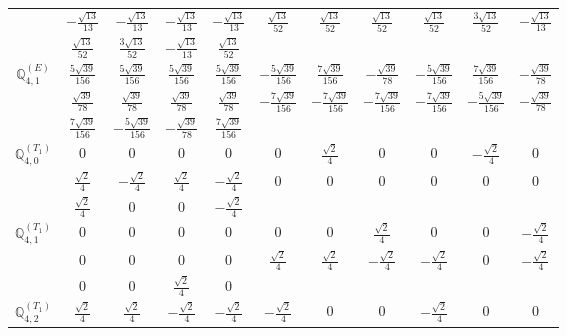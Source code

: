 \documentclass[fleqn,10pt,landscape]{article}
\begin{document}
\begin{itemize}
{\begin{center}
\begin{longtable}{ccccccccccc}
& $ - \frac{\sqrt{13}}{13} $ & $ - \frac{\sqrt{13}}{13} $ & $ - \frac{\sqrt{13}}{13} $ & $ - \frac{\sqrt{13}}{13} $ & $ \frac{\sqrt{13}}{52} $ & $ \frac{\sqrt{13}}{52} $ & $ \frac{\sqrt{13}}{52} $ & $ \frac{\sqrt{13}}{52} $ & $ \frac{3 \sqrt{13}}{52} $ & $ - \frac{\sqrt{13}}{13} $ \\
& $ \frac{\sqrt{13}}{52} $ & $ \frac{3 \sqrt{13}}{52} $ & $ - \frac{\sqrt{13}}{13} $ & $ \frac{\sqrt{13}}{52} $ & $  $ & $  $ & $  $ & $  $ & $  $ & $  $ \\ \hline
$\mathbb{Q}_{4,1}^{(E)}$ & $ \frac{5 \sqrt{39}}{156} $ & $ \frac{5 \sqrt{39}}{156} $ & $ \frac{5 \sqrt{39}}{156} $ & $ \frac{5 \sqrt{39}}{156} $ & $ - \frac{5 \sqrt{39}}{156} $ & $ \frac{7 \sqrt{39}}{156} $ & $ - \frac{\sqrt{39}}{78} $ & $ - \frac{5 \sqrt{39}}{156} $ & $ \frac{7 \sqrt{39}}{156} $ & $ - \frac{\sqrt{39}}{78} $ \\
& $ \frac{\sqrt{39}}{78} $ & $ \frac{\sqrt{39}}{78} $ & $ \frac{\sqrt{39}}{78} $ & $ \frac{\sqrt{39}}{78} $ & $ - \frac{7 \sqrt{39}}{156} $ & $ - \frac{7 \sqrt{39}}{156} $ & $ - \frac{7 \sqrt{39}}{156} $ & $ - \frac{7 \sqrt{39}}{156} $ & $ - \frac{5 \sqrt{39}}{156} $ & $ - \frac{\sqrt{39}}{78} $ \\
& $ \frac{7 \sqrt{39}}{156} $ & $ - \frac{5 \sqrt{39}}{156} $ & $ - \frac{\sqrt{39}}{78} $ & $ \frac{7 \sqrt{39}}{156} $ & $  $ & $  $ & $  $ & $  $ & $  $ & $  $ \\ \hline
$\mathbb{Q}_{4,0}^{(T_{1})}$ & $ 0 $ & $ 0 $ & $ 0 $ & $ 0 $ & $ 0 $ & $ \frac{\sqrt{2}}{4} $ & $ 0 $ & $ 0 $ & $ - \frac{\sqrt{2}}{4} $ & $ 0 $ \\
& $ \frac{\sqrt{2}}{4} $ & $ - \frac{\sqrt{2}}{4} $ & $ \frac{\sqrt{2}}{4} $ & $ - \frac{\sqrt{2}}{4} $ & $ 0 $ & $ 0 $ & $ 0 $ & $ 0 $ & $ 0 $ & $ 0 $ \\
& $ \frac{\sqrt{2}}{4} $ & $ 0 $ & $ 0 $ & $ - \frac{\sqrt{2}}{4} $ & $  $ & $  $ & $  $ & $  $ & $  $ & $  $ \\ \hline
$\mathbb{Q}_{4,1}^{(T_{1})}$ & $ 0 $ & $ 0 $ & $ 0 $ & $ 0 $ & $ 0 $ & $ 0 $ & $ \frac{\sqrt{2}}{4} $ & $ 0 $ & $ 0 $ & $ - \frac{\sqrt{2}}{4} $ \\
& $ 0 $ & $ 0 $ & $ 0 $ & $ 0 $ & $ \frac{\sqrt{2}}{4} $ & $ \frac{\sqrt{2}}{4} $ & $ - \frac{\sqrt{2}}{4} $ & $ - \frac{\sqrt{2}}{4} $ & $ 0 $ & $ - \frac{\sqrt{2}}{4} $ \\
& $ 0 $ & $ 0 $ & $ \frac{\sqrt{2}}{4} $ & $ 0 $ & $  $ & $  $ & $  $ & $  $ & $  $ & $  $ \\ \hline
$\mathbb{Q}_{4,2}^{(T_{1})}$ & $ \frac{\sqrt{2}}{4} $ & $ \frac{\sqrt{2}}{4} $ & $ - \frac{\sqrt{2}}{4} $ & $ - \frac{\sqrt{2}}{4} $ & $ - \frac{\sqrt{2}}{4} $ & $ 0 $ & $ 0 $ & $ - \frac{\sqrt{2}}{4} $ & $ 0 $ & $ 0 $ \\

\end{longtable}
\end{center}}
\end{itemize}
\end{document}
